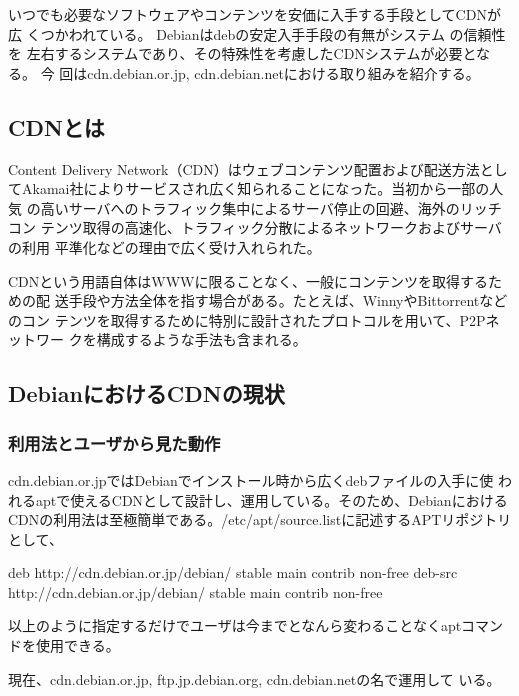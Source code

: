 \documentclass[mingoth,a4paper]{jsarticle}
\begin{document}

いつでも必要なソフトウェアやコンテンツを安価に入手する手段としてCDNが広
くつかわれている。 Debianはdebの安定入手手段の有無がシステム の信頼性を
左右するシステムであり、その特殊性を考慮したCDNシステムが必要となる。 今
回はcdn.debian.or.jp, cdn.debian.netにおける取り組みを紹介する。

\subsection{CDNとは}

Content Delivery Network（CDN）はウェブコンテンツ配置および配送方法とし
てAkamai社によりサービスされ広く知られることになった。当初から一部の人気
の高いサーバへのトラフィック集中によるサーバ停止の回避、海外のリッチコン
テンツ取得の高速化、トラフィック分散によるネットワークおよびサーバの利用
平準化などの理由で広く受け入れられた。

CDNという用語自体はWWWに限ることなく、一般にコンテンツを取得するための配
送手段や方法全体を指す場合がある。たとえば、WinnyやBittorrentなどのコン
テンツを取得するために特別に設計されたプロトコルを用いて、P2Pネットワー
クを構成するような手法も含まれる。

\subsection{DebianにおけるCDNの現状}

\subsubsection{利用法とユーザから見た動作}

cdn.debian.or.jpではDebianでインストール時から広くdebファイルの入手に使
われるaptで使えるCDNとして設計し、運用している。そのため、Debianにおける
CDNの利用法は至極簡単である。/etc/apt/source.listに記述するAPTリポジトリ
として、

\begin{commandline}
deb http://cdn.debian.or.jp/debian/ stable main contrib non-free
deb-src http://cdn.debian.or.jp/debian/ stable main contrib non-free
\end{commandline}

以上のように指定するだけでユーザは今までとなんら変わることなくaptコマン
ドを使用できる。

現在、cdn.debian.or.jp, ftp.jp.debian.org, cdn.debian.netの名で運用して
いる。
\end{document}
